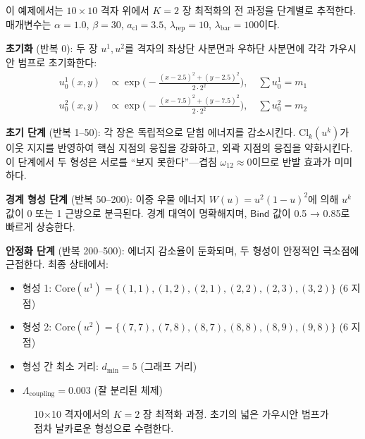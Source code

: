 \begin{example}
\label{ex:10x10-k-field}
이 예제에서는 $10 \times 10$ 격자 위에서 $K = 2$ 장 최적화의 전 과정을 단계별로 추적한다. 매개변수는 $\alpha = 1.0$, $\beta = 30$, $a_{\mathrm{cl}} = 3.5$, $\lambda_{\mathrm{rep}} = 10$, $\lambda_{\mathrm{bar}} = 100$이다.

\textbf{초기화} (반복 0): 두 장 $u^1, u^2$를 격자의 좌상단 사분면과 우하단 사분면에 각각 가우시안 범프로 초기화한다:
\begin{align}
    u^1_0(x,y) &\propto \exp\!\big(-\tfrac{(x-2.5)^2 + (y-2.5)^2}{2 \cdot 2^2}\big), \quad \sum u^1_0 = m_1 \nonumber \\
    u^2_0(x,y) &\propto \exp\!\big(-\tfrac{(x-7.5)^2 + (y-7.5)^2}{2 \cdot 2^2}\big), \quad \sum u^2_0 = m_2 \nonumber
\end{align}

\textbf{초기 단계} (반복 1--50): 각 장은 독립적으로 닫힘 에너지를 감소시킨다. $\mathrm{Cl}_k(u^k)$가 이웃 지지를 반영하여 핵심 지점의 응집을 강화하고, 외곽 지점의 응집을 약화시킨다. 이 단계에서 두 형성은 서로를 ``보지 못한다''---겹침 $\omega_{12} \approx 0$이므로 반발 효과가 미미하다.

\textbf{경계 형성 단계} (반복 50--200): 이중 우물 에너지 $W(u) = u^2(1-u)^2$에 의해 $u^k$ 값이 0 또는 1 근방으로 분극된다. 경계 대역이 명확해지며, $\mathsf{Bind}$ 값이 0.5 → 0.85로 빠르게 상승한다.

\textbf{안정화 단계} (반복 200--500): 에너지 감소율이 둔화되며, 두 형성이 안정적인 극소점에 근접한다. 최종 상태에서:
\begin{itemize}
    \item 형성 1: $\mathrm{Core}(u^1) = \{(1,1), (1,2), (2,1), (2,2), (2,3), (3,2)\}$ (6 지점)
    \item 형성 2: $\mathrm{Core}(u^2) = \{(7,7), (7,8), (8,7), (8,8), (8,9), (9,8)\}$ (6 지점)
    \item 형성 간 최소 거리: $d_{\min} = 5$ (그래프 거리)
    \item $\Lambda_{\mathrm{coupling}} = 0.003$ (잘 분리된 체제)
\end{itemize}
\end{example}

\begin{figure}[t]
\centering
{}
\caption{10$\times$10 격자에서의 $K=2$ 장 최적화 과정. 초기의 넓은 가우시안 범프가 점차 날카로운 형성으로 수렴한다.}
\label{fig:10x10-optimization}
\end{figure}

